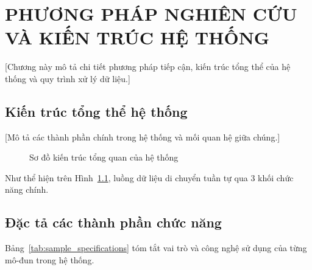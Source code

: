 \chapter{PHƯƠNG PHÁP NGHIÊN CỨU VÀ KIẾN TRÚC HỆ THỐNG}
\label{chap:methodology}

[Chương này mô tả chi tiết phương pháp tiếp cận, kiến trúc tổng thể của hệ thống và quy trình xử lý dữ liệu.]

\section{Kiến trúc tổng thể hệ thống}
\label{sec:architecture}

[Mô tả các thành phần chính trong hệ thống và mối quan hệ giữa chúng.]

\begin{figure}[H]
    \centering
    \caption{Sơ đồ kiến trúc tổng quan của hệ thống}
    \label{fig:sample_architecture}
\end{figure}

Như thể hiện trên Hình~\ref{fig:sample_architecture}, luồng dữ liệu di chuyển tuần tự qua 3 khối chức năng chính.

\section{Đặc tả các thành phần chức năng}
\label{sec:specifications}

Bảng~\ref{tab:sample_specifications} tóm tắt vai trò và công nghệ sử dụng của từng mô-đun trong hệ thống.

